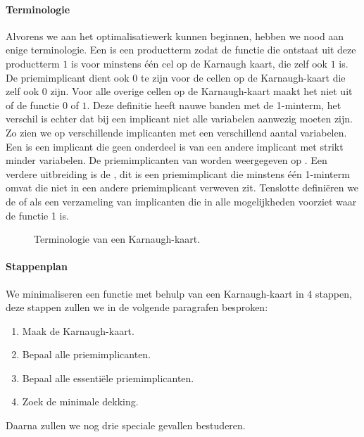 \paragraph{Terminologie}
Alvorens we aan het optimalisatiewerk kunnen beginnen, hebben we nood aan enige terminologie. Een  is een productterm zodat de functie die ontstaat uit deze productterm $1$ is voor minstens \'e\'en cel op de Karnaugh kaart, die zelf ook $1$ is. De priemimplicant dient ook $0$ te zijn voor de cellen op de Karnaugh-kaart die zelf ook $0$ zijn. Voor alle overige cellen op de Karnaugh-kaart maakt het niet uit of de functie $0$ of $1$. Deze definitie heeft nauwe banden met de 1-minterm, het verschil is echter dat bij een implicant niet alle variabelen aanwezig moeten zijn. Zo zien we op  verschillende implicanten met een verschillend aantal variabelen. Een  is een implicant die geen onderdeel is van een andere implicant met strikt minder variabelen. De priemimplicanten van  worden weergegeven op . Een verdere uitbreiding is de , dit is een priemimplicant die minstens \'e\'en 1-minterm omvat die niet in een andere priemimplicant verweven zit. Tenslotte defini\"eren we de  of  als een verzameling van implicanten die in alle mogelijkheden voorziet waar de functie 1 is.

\begin{figure}[hbt]
\centering
{}
\caption{Terminologie van een Karnaugh-kaart.}
\end{figure}
\paragraph{Stappenplan}
We minimaliseren een functie met behulp van een Karnaugh-kaart in 4 stappen, deze stappen zullen we in de volgende paragrafen besproken:
\begin{enumerate}
 \item Maak de Karnaugh-kaart.
 \item Bepaal alle priemimplicanten.
 \item Bepaal alle essenti\"ele priemimplicanten.
 \item Zoek de minimale dekking.
\end{enumerate}
Daarna zullen we nog drie speciale gevallen bestuderen.
